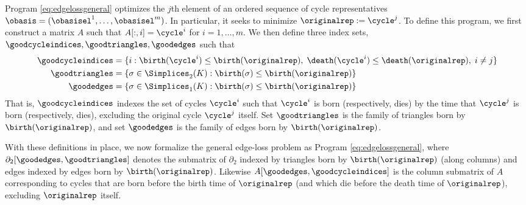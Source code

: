 Program \eqref{eq:edgelossgeneral} optimizes the $j$th element of an ordered sequence of cycle representatives $\obasis = (\obasisel^1, \ldots, \obasisel^m)$.  In particular, it seeks to minimize $\originalrep := \cycle^j$.  To define this program, we first construct a matrix $A$ such that $A[:, i] = \cycle^i$ for $i = 1, \ldots, m$.  We then define  three index sets, $\goodcycleindices, \goodtriangles, \goodedges$ such that 
    \begin{align*}
        \goodcycleindices &= \{ i :  \birth(\cycle^i) \le \birth(\originalrep), \;  \death(\cycle^i) \le \death(\originalrep), \; i \neq j \} \\
        \goodtriangles &= \{\sigma \in \Simplices_2(K) : \birth(\sigma) \le \birth(\originalrep)\} 
        \\
        \goodedges &= \{\sigma \in \Simplices_1(K) : \birth(\sigma) \le \birth(\originalrep)\}
    \end{align*} 
That is, $\goodcycleindices$ indexes the set of cycles $\cycle^i$ such that $\cycle^i$ is born  (respectively, dies) by the time that $\cycle^j$ is born (respectively, dies),  excluding the original cycle $\cycle^j$ itself. Set $\goodtriangles$ is the family of triangles born by $\birth(\originalrep)$, and set $\goodedges$ is the family of edges born by $\birth(\originalrep)$. 

With these definitions in place, we now formalize the general edge-loss problem as Program \eqref{eq:edgelossgeneral}, where  $\partial_2[\goodedges,\goodtriangles]$ denotes the  submatrix of $\partial_2$ indexed by triangles born by $\birth(\originalrep)$ (along columns) and edges indexed by edges born by $\birth(\originalrep)$.  Likewise $A[ \goodedges ,\goodcycleindices]$ is the column submatrix of $A$ corresponding to cycles that are born  before the birth time of $\originalrep$ (and which die before the death time of $\originalrep$), excluding $\originalrep$ itself.



